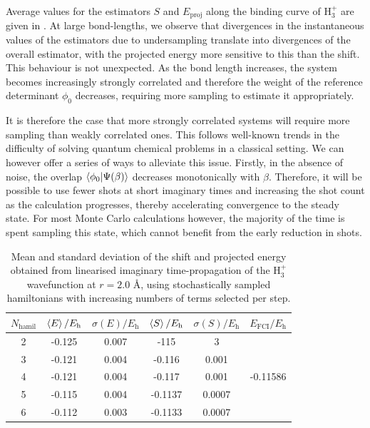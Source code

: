 \documentclass[%
 reprint,
 amsmath,amssymb,
 aps,
]{revtex4-2}
\begin{document}
Average values for the estimators $S$ and $E_\mathrm{proj}$ along the binding curve of H$_3^+$ are given in . At large bond-lengths, we observe that divergences in the instantaneous values of the estimators due to undersampling translate into divergences of the overall estimator, with the projected energy more sensitive to this than the shift. This behaviour is not unexpected. As the bond length increases, the system becomes increasingly strongly correlated and therefore the weight of the reference determinant $\phi_0$ decreases, requiring more sampling to estimate it appropriately.

It is therefore the case that more strongly correlated systems will require more sampling than weakly correlated ones. This follows well-known trends in the difficulty of solving quantum chemical problems in a classical setting. We can however offer a series of ways to alleviate this issue. Firstly, in the absence of noise, the overlap $\braket{\phi_0|\Psi(\beta)}$ decreases monotonically with $\beta$. Therefore, it will be possible to use fewer shots at short imaginary times and increasing the shot count as the calculation progresses, thereby accelerating convergence to the steady state. For most Monte Carlo calculations however, the majority of the time is spent sampling this state, which cannot benefit from the early reduction in shots. 

\begin{table}
    \centering
    \begin{tabular}{c|c|c|c|c|c}
      $N_\mathrm{hamil}$ &  $\braket{E}/E_\mathrm{h}$ & $\sigma(E)/E_\mathrm{h}$ & $\braket{S}/E_\mathrm{h}$ & $\sigma(S)/E_\mathrm{h}$&$E_\mathrm{FCI}/E_\mathrm{h}$\\
      \hline
         2&-0.125&0.007&-115&3&\multirow{5}{*}{-0.11586}\\
         3& -0.121& 0.004& -0.116& 0.001&\\
         4 & -0.121& 0.004& -0.117& 0.001&\\
         5 & -0.115& 0.004& -0.1137& 0.0007&\\
         6 & -0.112 & 0.003 & -0.1133& 0.0007&\\
         \hline
    \end{tabular}
    \caption{\small \justifying Mean and standard deviation of the shift and projected energy obtained from linearised imaginary time-propagation of the H$_3^+$ wavefunction at $r=2.0$ \r{A}, using stochastically sampled hamiltonians with increasing numbers of terms selected per step.}
    \label{tab:hamil}
\end{table}
\end{document}
